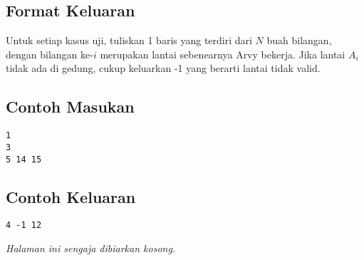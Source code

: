 \documentclass{article}
\begin{document}
\subsection*{Format Keluaran}

Untuk setiap kasus uji, tuliskan 1 baris yang terdiri dari $N$ buah bilangan, dengan bilangan ke-$i$ merupakan lantai sebenearnya Arvy bekerja.
Jika lantai $A_i$ tidak ada di gedung, cukup keluarkan -1 yang berarti lantai tidak valid.
\\

\begin{multicols}{2}
\subsection*{Contoh Masukan}
\begin{lstlisting}
1
3
5 14 15
\end{lstlisting}
\columnbreak
\subsection*{Contoh Keluaran}
\begin{lstlisting}
4 -1 12
\end{lstlisting}
\vfill
\null
\end{multicols}

\newpage
\vspace*{\fill}
\begin{center}
    \textit{Halaman ini sengaja dibiarkan kosong.}
\end{center}
\vspace*{\fill}
\end{document}
